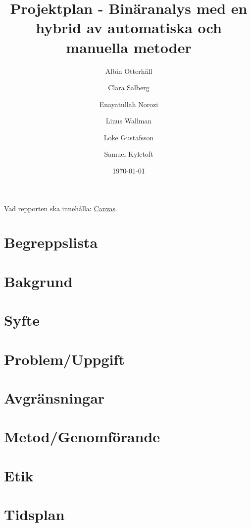 \documentclass[12pt, a4paper]{article}
\title{Projektplan - Binäranalys med en hybrid av automatiska och manuella metoder}
\author{
    Albin Otterhäll \and
    Clara Salberg \and
    Enayatullah Norozi \and
    Linus Wallman \and
    Loke Gustafsson \and
    Samuel Kyletoft
}
\date{\today}
\begin{document}
\maketitle

\newpage

\listoftodos
\newpage

\tableofcontents
\newpage

Vad repporten ska innehålla:
\href{https://chalmers.instructure.com/courses/22323/assignments/66457?module_item_id=337856}{Canvas}.


\section{Begreppslista}


\section{Bakgrund}


\section{Syfte}


\section{Problem/Uppgift}


\section{Avgränsningar}


\section{Metod/Genomförande}


\section{Etik}


\section{Tidsplan}


\end{document}

